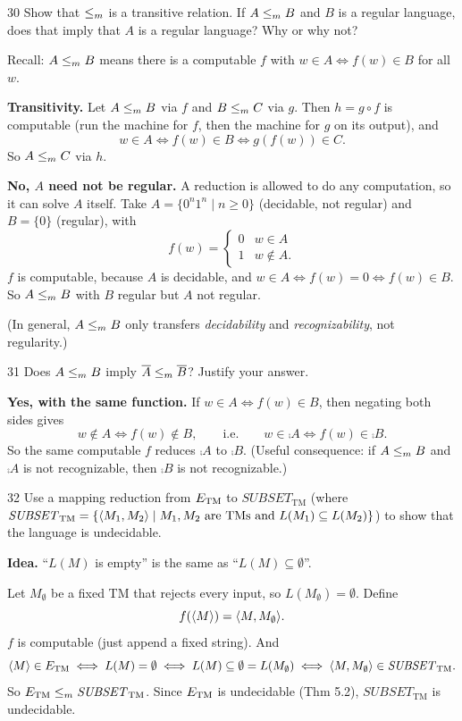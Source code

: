 \begin{question}{30}
Show that $\le_{m}$ is a transitive relation. If $A\le_{m} B$ and $B$ is a regular language, does that imply that $A$ is a regular language? Why or why not?
\end{question}
\begin{soln}
Recall: $A\le_{m} B$ means there is a computable $f$ with $w\in A\iff f(w)\in B$ for all $w$.

\textbf{Transitivity.} Let $A\le_{m} B$ via $f$ and $B\le_{m} C$ via $g$. Then $h=g\circ f$ is computable (run the machine for $f$, then the machine for $g$ on its output), and
\[
w\in A\iff f(w)\in B\iff g(f(w))\in C .
\]
So $A\le_{m} C$ via $h$.

\textbf{No, $A$ need not be regular.} A reduction is allowed to do any computation, so it can solve $A$ itself. Take $A=\{0^n1^n\mid n\ge0\}$ (decidable, not regular) and $B=\{0\}$ (regular), with
\[
f(w)=\begin{cases}0 & w\in A\\ 1 & w\notin A.\end{cases}
\]
$f$ is computable, because $A$ is decidable, and $w\in A\iff f(w)=0\iff f(w)\in B$. So $A\le_{m} B$ with $B$ regular but $A$ not regular.

(In general, $A\le_{m} B$ only transfers \emph{decidability} and \emph{recognizability}, not regularity.)
\end{soln}

\begin{question}{31}
Does $A\le_{m} B$ imply $\overline{A}\le_{m}\overline{B}$? Justify your answer.
\end{question}
\begin{soln}
\textbf{Yes, with the same function.} If $w\in A\iff f(w)\in B$, then negating both sides gives
\[
w\notin A\iff f(w)\notin B,\qquad\text{i.e.}\qquad w\in\comp A\iff f(w)\in\comp B .
\]
So the same computable $f$ reduces $\comp A$ to $\comp B$.
(Useful consequence: if $A\le_{m} B$ and $\comp A$ is not recognizable, then $\comp B$ is not recognizable.)
\end{soln}

\begin{question}{32}
Use a mapping reduction from $E_{\mathrm{TM}}$ to $\mathit{SUBSET}_{\mathrm{TM}}$ (where $\mathit{SUBSET}_{\mathrm{TM}}=\{\langle M_1,M_2\rangle\mid M_1,M_2 \text{ are TMs and } L(M_1)\subseteq L(M_2)\}$) to show that the language is undecidable.
\end{question}
\begin{soln}
\textbf{Idea.} ``$L(M)$ is empty'' is the same as ``$L(M)\subseteq\emptyset$''.

Let $M_\emptyset$ be a fixed TM that rejects every input, so $L(M_\emptyset)=\emptyset$. Define
\[
f(\langle M\rangle)=\langle M,M_\emptyset\rangle.
\]
$f$ is computable (just append a fixed string). And
\[
\langle M\rangle\in E_{\mathrm{TM}}\iff L(M)=\emptyset\iff L(M)\subseteq\emptyset=L(M_\emptyset)\iff\langle M,M_\emptyset\rangle\in\mathit{SUBSET}_{\mathrm{TM}}.
\]
So $E_{\mathrm{TM}}\le_{m}\mathit{SUBSET}_{\mathrm{TM}}$. Since $E_{\mathrm{TM}}$ is undecidable (Thm 5.2), $\mathit{SUBSET}_{\mathrm{TM}}$ is undecidable.
\end{soln}

